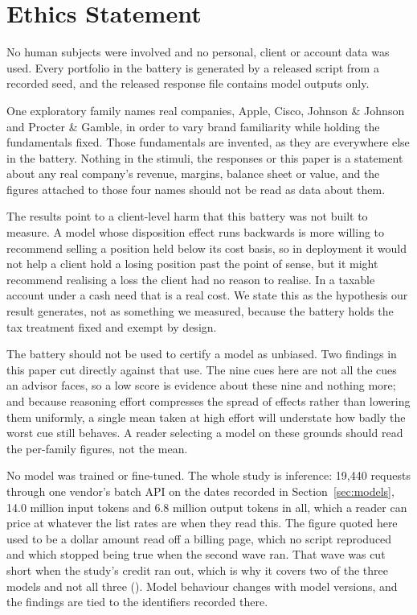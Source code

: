 \section{Ethics Statement}
No human subjects were involved and no personal, client or account data was
used. Every portfolio in the battery is generated by a released script from a
recorded seed, and the released response file contains model outputs only.

One exploratory family names real companies, Apple, Cisco, Johnson \&
Johnson and Procter \& Gamble, in order to vary brand familiarity while
holding the fundamentals fixed. Those fundamentals are invented, as they are
everywhere else in the battery. Nothing in the stimuli, the responses or this
paper is a statement about any real company's revenue, margins, balance sheet
or value, and the figures attached to those four names should not be read as
data about them.

The results point to a client-level harm that this battery was not built to
measure. A model whose disposition effect runs backwards is more willing to
recommend selling a position held below its cost basis, so in deployment it
would not help a client hold a losing position past the point of sense, but
it might recommend realising a loss the client had no reason to realise. In a
taxable account under a cash need that is a real cost. We state this as the
hypothesis our result generates, not as something we measured, because the
battery holds the tax treatment fixed and exempt by design.

The battery should not be used to certify a model as unbiased. Two findings
in this paper cut directly against that use. The nine cues here are not all
the cues an advisor faces, so a low score is evidence about these nine and
nothing more; and because reasoning effort compresses the spread of effects
rather than lowering them uniformly, a single mean taken at high effort will
understate how badly the worst cue still behaves. A reader selecting a model
on these grounds should read the per-family figures, not the mean.

No model was trained or fine-tuned. The whole study is inference: 19,440
requests through one vendor's batch API on the dates recorded in
Section~\ref{sec:models}, 14.0 million input tokens and 6.8 million output
tokens in all, which a reader can price at whatever the list rates are when
they read this. The figure quoted here used to be a dollar amount read off a
billing page, which no script reproduced and which stopped being true when
the second wave ran. That wave was cut short when the study's credit ran out,
which is why it covers two of the three models and not all three
(). Model behaviour changes with model versions,
and the findings are tied to the identifiers recorded there.

